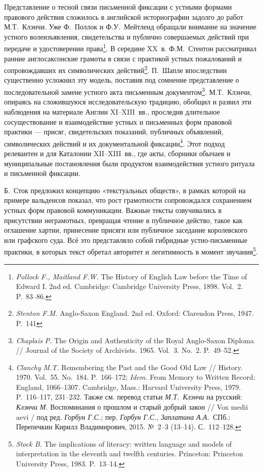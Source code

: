 Представление о тесной связи письменной фиксации с устными формами правового действия сложилось в английской историографии задолго до работ М.Т.~Клэнчи. Уже Ф.~Поллок и Ф.У.~Мейтленд обращали внимание на значение устного волеизъявления, свидетельства и публично совершаемых действий при передаче и удостоверении права\footnote{\emph{ Pollock F., Maitland F.W. }The History of English Law before the Time of Edward I. 2nd ed. Cambridge: Cambridge University Press, 1898. Vol.~2. P.~83--86.}. В середине XX~в. Ф.М.~Стентон рассматривал ранние англосаксонские грамоты в связи с практикой устных пожалований и сопровождавших их символических действий\footnote{\emph{Stenton F.M. }Anglo-Saxon England. 2nd ed. Oxford: Clarendon Press, 1947. P.~141}. П.~Шапле впоследствии существенно усложнил эту модель, поставив под сомнение представление о последовательной замене устного акта письменным документом\footnote{\emph{Chaplais}\emph{ P. }The Origin and Authenticity of the Royal Anglo-Saxon Diploma // Journal of the Society of Archivists. 1965. Vol.~3. No.~2. P.~49--52.}. М.Т.~Клэнчи, опираясь на сложившуюся исследовательскую традицию, обобщил и развил эти наблюдения на материале Англии XI--XIII~вв., проследив длительное сосуществование и взаимодействие устных и письменных форм правовой практики --- присяг, свидетельских показаний, публичных объявлений, символических действий и их документальной фиксации\footnote{\emph{Clanchy}\emph{ M.T.} Remembering the Past and the Good Old Law // History. 1970. Vol.~55. No.~184. P.~166--172; \emph{Idem.} From Memory to Written Record: England, 1066--1307\emph{.} Cambridge, Mass.: Harvard University Press, 1979. P.~116--117, 231--232. Также см. перевод статьи \emph{М.Т.~Клэнчи} на русский: \emph{Клэнчи}\emph{ }\emph{М}\emph{.} Воспоминания о прошлом и старый добрый закон // Vox medii aevi / под ред. \emph{Горбун Г.С.}; пер. \emph{Горбун Г.С.}, \emph{Заплатина А.А.}~СПб.: Перепечкин Кирилл Владимирович, 2015. №~2--3 (13--14). С.~112--128.}. Этот подход релевантен и для Каталонии XII--XIII~вв., где акты, сборники обычаев и муниципальные постановления были продуктом взаимодействия устного ритуала и письменной фиксации.

Б.~Сток предложил концепцию «текстуальных обществ», в рамках которой на примере вальденсов показал, что рост грамотности сопровождался сохранением устных форм правовой коммуникации. Важные тексты озвучивались в присутствии неграмотных, превращая чтение в публичное действо, такое как оглашение хартии, принесение присяги или публичное заседание королевского или графского суда. Всё это представляло собой гибридные устно-письменные практики, в которых текст обретал авторитет и легитимность в момент звучания\footnote{\emph{Stock B. }The implications of literacy: written language and models of interpretation in the eleventh and twelfth centuries. Princeton: Princeton University Press, 1983. P.~13--14.}.

